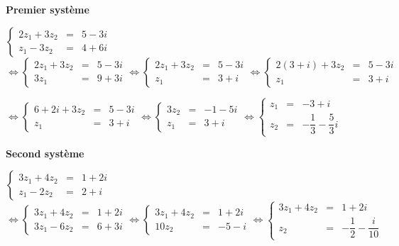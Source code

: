 \documentclass[11pt,fleqn, openany]{book} %
\begin{document}
\begin{solution}\hspace{0pt}

\textbf{Premier système}

\(\left\{\begin{array}{rcl}
2z_1+3z_2 &=& 5-3i\\
z_1-3z_2&=&4+6i\end{array}\right.\)\(\Leftrightarrow \left\{\begin{array}{rcl}
2z_1+3z_2 &=& 5-3i\\
3z_1 &=&9+3i \end{array}\right. \Leftrightarrow \left\{\begin{array}{rcl}
2z_1+3z_2 &=& 5-3i\\
z_1 &=&3+i \end{array}\right.\Leftrightarrow \left\{\begin{array}{rcl}
2(3+i)+3z_2 &=& 5-3i\\
z_1 &=&3+i \end{array}\right.\)

\(\Leftrightarrow \left\{\begin{array}{rcl}
6+2i+3z_2 &=& 5-3i\\
z_1 &=&3+i \end{array}\right.\Leftrightarrow \left\{\begin{array}{rcl}
3z_2 &=& -1-5i\\
z_1 &=&3+i \end{array}\right.\Leftrightarrow \left\{\begin{array}{rcl}
z_1 &=& -3+i\\
z_2 &=& -\dfrac{1}{3}-\dfrac{5}{3}i \end{array}\right.\)

\newpage 
\textbf{Second système}

\(\left\{\begin{array}{rcl}
3z_1+4z_2 &=& 1+2i\\
z_1-2z_2&=&2+i\end{array}\right.\)\(\Leftrightarrow \left\{\begin{array}{rcl}
3z_1+4z_2 &=& 1+2i\\
3z_1-6z_2 &=&6+3i\end{array}\right.\Leftrightarrow \left\{\begin{array}{rcl}
3z_1+4z_2 &=& 1+2i\\
10z_2 &=&-5-i  \end{array}\right.\Leftrightarrow \left\{\begin{array}{rcl}
3z_1+4z_2 &=& 1+2i\\
z_2 &=&-\dfrac{1}{2}-\dfrac{i}{10} \end{array}\right.\)


\end{solution}
\end{document}
